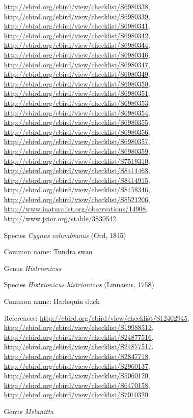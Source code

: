 \documentclass[9pt, article]{memoir}
\begin{document}
\begin{multicols}{2}
\url{http://ebird.org/ebird/view/checklist/S6980338}, 
\url{http://ebird.org/ebird/view/checklist/S6980339}, 
\url{http://ebird.org/ebird/view/checklist/S6980341}, 
\url{http://ebird.org/ebird/view/checklist/S6980342}, 
\url{http://ebird.org/ebird/view/checklist/S6980344}, 
\url{http://ebird.org/ebird/view/checklist/S6980346}, 
\url{http://ebird.org/ebird/view/checklist/S6980347}, 
\url{http://ebird.org/ebird/view/checklist/S6980349}, 
\url{http://ebird.org/ebird/view/checklist/S6980350}, 
\url{http://ebird.org/ebird/view/checklist/S6980351}, 
\url{http://ebird.org/ebird/view/checklist/S6980353}, 
\url{http://ebird.org/ebird/view/checklist/S6980354}, 
\url{http://ebird.org/ebird/view/checklist/S6980355}, 
\url{http://ebird.org/ebird/view/checklist/S6980356}, 
\url{http://ebird.org/ebird/view/checklist/S6980357}, 
\url{http://ebird.org/ebird/view/checklist/S6980359}, 
\url{http://ebird.org/ebird/view/checklist/S7519310}, 
\url{http://ebird.org/ebird/view/checklist/S8414468}, 
\url{http://ebird.org/ebird/view/checklist/S8414915}, 
\url{http://ebird.org/ebird/view/checklist/S8458346}, 
\url{http://ebird.org/ebird/view/checklist/S8521206}, 
\url{http://www.inaturalist.org/observations/14908}, 
\url{http://www.jstor.org/stable/3830542}.

\vspace{6pt}\noindent\hspace{36pt}Species \textit{Cygnus columbianus} (Ord, 1815)


Common name: Tundra swan

\vspace{6pt}\noindent\hspace{30pt}Genus \textit{Histrionicus}


\vspace{6pt}\noindent\hspace{36pt}Species \textit{Histrionicus histrionicus} (Linnaeus, 1758)


Common name: Harlequin duck

References: 
\url{http://ebird.org/ebird/view/checklist/S12402945}, 
\url{http://ebird.org/ebird/view/checklist/S19988512}, 
\url{http://ebird.org/ebird/view/checklist/S24877516}, 
\url{http://ebird.org/ebird/view/checklist/S24877517}, 
\url{http://ebird.org/ebird/view/checklist/S2847718}, 
\url{http://ebird.org/ebird/view/checklist/S2960137}, 
\url{http://ebird.org/ebird/view/checklist/S5060120}, 
\url{http://ebird.org/ebird/view/checklist/S6470158}, 
\url{http://ebird.org/ebird/view/checklist/S7010320}.

\vspace{6pt}\noindent\hspace{30pt}Genus \textit{Melanitta}



\end{multicols}
\end{document}
